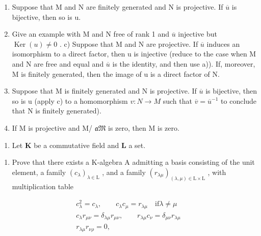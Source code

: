 \begin{enumerate}
\def\labelenumi{\alph{enumi})}
\item
  Suppose that M and N are finitely generated and N is projective. If \(\overline{u}\) is bijective, then so is u.
\item
  Give an example with M and N free of rank 1 and \(\overline{u}\) injective but \(\operatorname{Ker}(u) \neq 0\) . c) Suppose that M and N are projective. If \(\overline{u}\) induces an isomorphism to a direct factor, then u is injective (reduce to the case when M and N are free and equal and \(\overline{u}\) is the identity, and then use a)). If, moreover, M is finitely generated, then the image of u is a direct factor of N.
\item
  Suppose that M is finitely generated and N is projective. If \(\overline{u}\) is bijective, then so is u (apply c) to a homomorphism \(v: N \to M\) such that \(\overline{v} = \overline{u}^{-1}\) to conclude that N is finitely generated).
\item
  If M is projective and M/ \(\mathfrak{aM}\) is zero, then M is zero.
\end{enumerate}

\begin{enumerate}
\def\labelenumi{\arabic{enumi})}
\setcounter{enumi}{16}
\tightlist
\item
  Let \(\mathbf{K}\) be a commutative field and \(\mathbf{L}\) a set.
\end{enumerate}

\begin{enumerate}
\def\labelenumi{\alph{enumi})}
\tightlist
\item
  Prove that there exists a K-algebra A admitting a basis consisting of the unit element, a family \((c_{\lambda})_{\lambda \in \mathrm{L}}\) , and a family \((r_{\lambda \mu})_{(\lambda ,\mu)\in \mathrm{L}\times \mathrm{L}}\) , with multiplication table
\end{enumerate}

\[
\begin{array}{r} c _ {\lambda} ^ {2} = c _ {\lambda}, \qquad c _ {\lambda} c _ {\mu} = r _ {\lambda \mu} \quad \mathrm{if} \lambda \neq \mu \\ c _ {\lambda} r _ {\mu \nu} = \delta_ {\lambda \mu} r _ {\mu \nu}, \qquad r _ {\lambda \mu} c _ {\nu} = \delta_ {\mu \nu} r _ {\lambda \mu} \\ r _ {\lambda \mu} r _ {\nu \rho} = 0, \end{array}
\]

